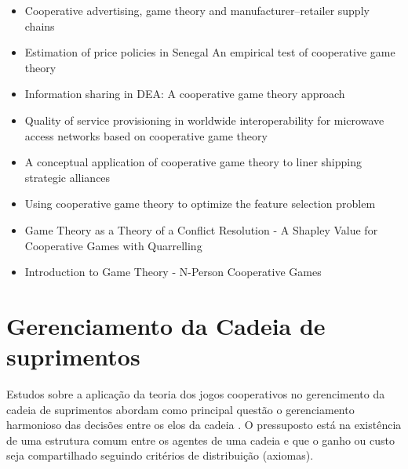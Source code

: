 \documentclass[
	article,			        %
	11pt,				          %
	oneside,			        %
	a4paper,			        %
	english,			        %
	brazil,				        %
	sumario=tradicional
]{abntex2}\usepackage[]{graphicx}\usepackage[]{color}
\begin{document}
\begin{itemize}
    \item Cooperative advertising, game theory and manufacturer--retailer supply chains \cite{Xie.2006}
    \item Estimation of price policies in Senegal An empirical test of cooperative game theory \cite{Beghin.1991}
    \item Information sharing in DEA: A cooperative game theory approach \cite{Lozano.2012}
    \item Quality of service provisioning in worldwide interoperability for microwave access networks based on cooperative game theory \cite{Jiao.2011}
    \item A conceptual application of cooperative game theory to liner shipping strategic alliances \cite{Song.2002}
    \item Using cooperative game theory to optimize the feature selection problem \cite{Sun.2012}
    \item Game Theory as a Theory of a Conflict Resolution - A Shapley Value for Cooperative Games with Quarrelling \cite{Rapoport.1974}
    \item Introduction to Game Theory - N-Person Cooperative Games \cite{Morris.1994}    
  \end{itemize}
  
\section{Gerenciamento da Cadeia de suprimentos}

Estudos sobre a aplicação da teoria dos jogos cooperativos no gerencimento da cadeia de suprimentos abordam como principal questão o gerenciamento harmonioso das decisões entre os elos da cadeia \cite{Dobos.2010a}. O pressuposto está na existência de uma estrutura comum entre os agentes de uma cadeia e que o ganho ou custo seja compartilhado seguindo critérios de distribuição (axiomas)\cite{Bezerra.2009}.
\end{document}
